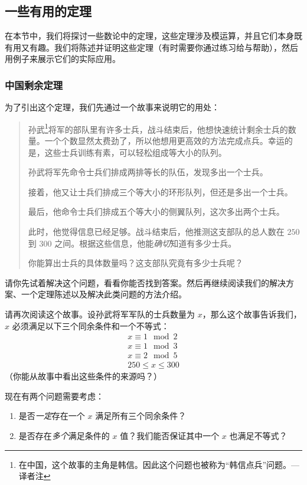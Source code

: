 
\subsection{一些有用的定理}

在本节中，我们将探讨一些数论中的定理，这些定理涉及模运算，并且它们本身既有用又有趣。我们将陈述并证明这些定理（有时需要你通过练习给与帮助），然后用例子来展示它们的实际应用。

\subsubsection*{中国剩余定理}

为了引出这个定理，我们先通过一个故事来说明它的用处：

\begin{quote}
    孙武\footnote{在中国，这个故事的主角是韩信。因此这个问题也被称为``韩信点兵''问题。--- 译者注}将军的部队里有许多士兵，战斗结束后，他想快速统计剩余士兵的数量。一个个数显然太费劲了，所以他想用更高效的方法完成点兵。幸运的是，这些士兵训练有素，可以轻松组成等大小的队列。

    孙武将军先命令士兵们排成两排等长的队伍，发现多出一个士兵。

    接着，他又让士兵们排成三个等大小的环形队列，但还是多出一个士兵。

    最后，他命令士兵们排成五个等大小的侧翼队列，这次多出两个士兵。

    此时，他觉得信息已经足够。战斗结束后，他推测这支部队的总人数在 $250$ 到 $300$ 之间。根据这些信息，他能\emph{确切}知道有多少士兵。
    
    你能算出士兵的具体数量吗？这支部队究竟有多少士兵呢？
\end{quote}

请你先试着解决这个问题，看看你能否找到答案。然后再继续阅读我们的解决方案、一个定理陈述以及解决此类问题的方法介绍。

请再次阅读这个故事。设孙武将军军队的士兵数量为 $x$，那么这个故事告诉我们，$x$ 必须满足以下三个同余条件和一个不等式：
\begin{align*}
    x \equiv 1 \mod 2 \\
    x \equiv 1 \mod 3 \\
    x \equiv 2 \mod 5 \\
    250 \le x \le 300
\end{align*}
（你能从故事中看出这些条件的来源吗？）

现在有两个问题需要考虑：
\begin{enumerate}[label=(\arabic*)]
    \item 是否\emph{一定}存在一个 $x$ 满足所有三个同余条件？
    \item 是否存在\emph{多个}满足条件的 $x$ 值？我们能否保证其中一个 $x$ 也满足不等式？
\end{enumerate}

